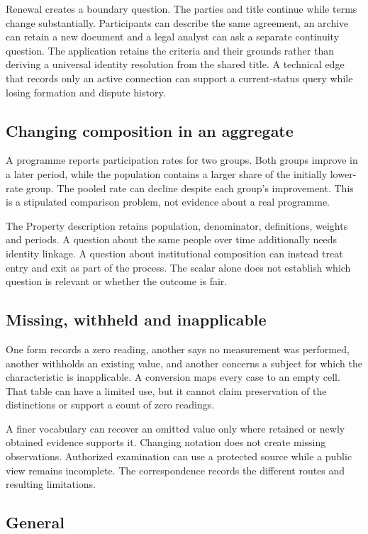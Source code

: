 \documentclass[11pt,a4paper]{article}
\begin{document}
Renewal creates a boundary question. The parties and title continue while terms change substantially. Participants can describe the same agreement, an archive can retain a new document and a legal analyst can ask a separate continuity question. The application retains the criteria and their grounds rather than deriving a universal identity resolution from the shared title. A technical edge that records only an active connection can support a current-status query while losing formation and dispute history.

\subsection{Changing composition in an aggregate}
A programme reports participation rates for two groups. Both groups improve in a later period, while the population contains a larger share of the initially lower-rate group. The pooled rate can decline despite each group's improvement. This is a stipulated comparison problem, not evidence about a real programme.

The Property description retains population, denominator, definitions, weights and periods. A question about the same people over time additionally needs identity linkage. A question about institutional composition can instead treat entry and exit as part of the process. The scalar alone does not establish which question is relevant or whether the outcome is fair.

\subsection{Missing, withheld and inapplicable}
One form records a zero reading, another says no measurement was performed, another withholds an existing value, and another concerns a subject for which the characteristic is inapplicable. A conversion maps every case to an empty cell. That table can have a limited use, but it cannot claim preservation of the distinctions or support a count of zero readings.

A finer vocabulary can recover an omitted value only where retained or newly obtained evidence supports it. Changing notation does not create missing observations. Authorized examination can use a protected source while a public view remains incomplete. The correspondence records the different routes and resulting limitations.
\subsection{General}
\end{document}
